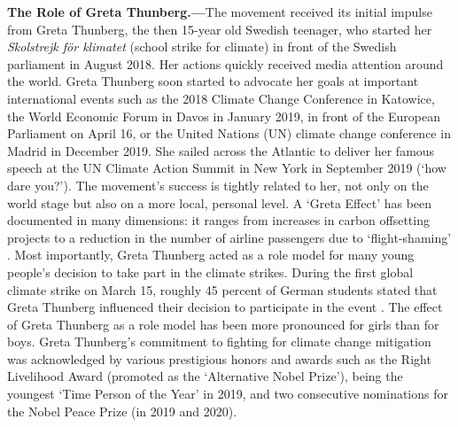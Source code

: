 \textbf{The Role of Greta Thunberg.---}The movement received its initial impulse from Greta Thunberg, the then 15-year old Swedish teenager, who started her \textit{Skolstrejk för klimatet} (school strike for climate) in front of the Swedish parliament in August 2018. Her actions quickly received media attention around the world. Greta Thunberg soon started to advocate her goals at important international events such as the 2018 Climate Change Conference in Katowice, the World Economic Forum in Davos in January 2019, in front of the European Parliament on April 16, or the United Nations (UN) climate change conference in Madrid in December 2019. She sailed across the Atlantic to deliver her famous speech at the UN Climate Action Summit in New York in September 2019 (`how dare you?'). The movement's success is tightly related to her, not only on the world stage but also on a more local, personal level. A `Greta Effect' has been documented in many dimensions: it ranges from increases in carbon offsetting projects  \citep{guardian2019greta_effect} to a reduction in the number of airline passengers due to `flight-shaming' \citep{economist2019greta_effect}. Most importantly, Greta Thunberg acted as a role model for many young people's decision to take part in the climate strikes. During the first global climate strike on March 15, roughly 45 percent of German students stated that Greta Thunberg influenced their decision to participate in the event \citep{sommer2019fridays}. The effect of Greta Thunberg as a role model has been more pronounced for girls than for boys. Greta Thunberg's commitment to fighting for climate change mitigation was acknowledged by various prestigious honors and awards such as the Right Livelihood Award (promoted as the `Alternative Nobel Prize'), being the youngest `Time Person of the Year' in 2019, and two consecutive nominations for the Nobel Peace Prize (in 2019 and 2020).



